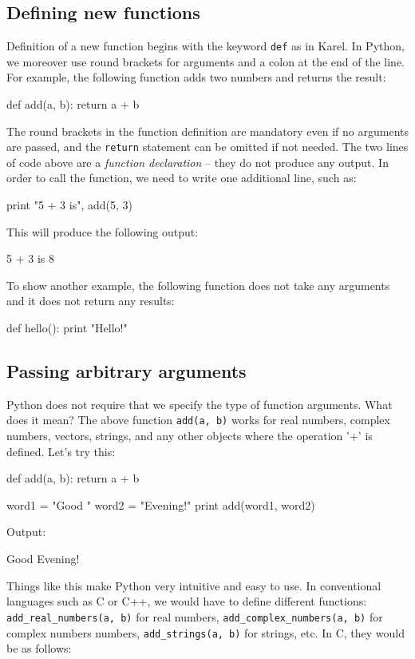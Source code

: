 \subsection{Defining new functions}

Definition of a new function begins with the keyword {\tt def} as in Karel. In Python,
we moreover use round brackets for arguments and a colon at the end of the line. 
For example, the following function adds two numbers
and returns the result:

\begin{bluecode}
def add(a, b):
    return a + b
\end{bluecode}
The round brackets in the function definition are mandatory even if no arguments are passed,
and the {\tt return} statement can be omitted if not needed.
The two lines of code above 
are a {\em function declaration} -- they do not produce any output.
In order to call the function, we need to write one additional line, such as:

\begin{bluecode}
print "5 + 3 is", add(5, 3)
\end{bluecode}
This will produce the following output:

\begin{bluecode}
5 + 3 is 8
\end{bluecode}
To show another example, the following function does not take any arguments 
and it does not return any results:

\begin{bluecode}
def hello():
    print "Hello!"
\end{bluecode}

\subsection{Passing arbitrary arguments}

Python does not require that we specify the type of function arguments. 
What does it mean? The above function {\tt add(a, b)} works for real
numbers, complex numbers, vectors, strings, and any other 
objects where the operation '+' is defined. Let's try this:

\begin{bluecode}
def add(a, b):
    return a + b

word1 = "Good "
word2 = "Evening!"
print add(word1, word2)
\end{bluecode}
Output:

\begin{bluecode}
Good Evening!
\end{bluecode}
Things like this make Python very intuitive and easy to use. In conventional languages such as C or C++, 
we would have to define different functions: {\tt add\_real\_numbers(a, b)} for real numbers,
{\tt add\_complex\_numbers(a, b)} for complex numbers numbers, {\tt add\_strings(a, b)} for strings, etc. 
In C, they would be as follows:

